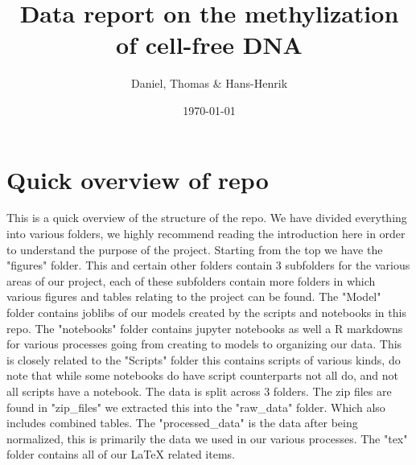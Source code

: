 \documentclass[a4paper, article, 11pt, oneside]{memoir}
\title{Data report on the methylization of cell-free DNA}
\author{Daniel, Thomas \& Hans-Henrik}
\date{\today}
\begin{document}
\maketitle
\tableofcontents*
\newpage
\chapter{Quick overview of repo}
This is a quick overview of the structure of the repo.
We have divided everything into various folders, we highly recommend reading the introduction here in order to understand the purpose of the project. 
Starting from the top we have the "figures" folder. This and certain other folders contain 3 subfolders for the various areas of our project, each of these subfolders contain more folders in which various figures and tables relating to the project can be found. 
The "Model" folder contains joblibs of our models created by the scripts and notebooks in this repo.
The "notebooks" folder contains jupyter notebooks as well a R markdowns for various processes going from creating to models to organizing our data.
This is closely related to the "Scripts" folder this contains scripts of various kinds, do note that while some notebooks do have script counterparts not all do, and not all scripts have a notebook. 
The data is split across 3 folders. The zip files are found in "zip\_files" we extracted this into the "raw\_data" folder. Which also includes combined tables.
The "processed\_data" is the data after being normalized, this is primarily the data we used in our various processes.
The "tex" folder contains all of our LaTeX related items.


\newpage

\newpage

\newpage

\newpage

\newpage

\end{document}
